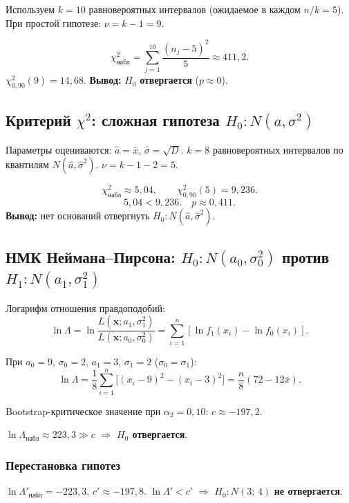 \documentclass[12pt,a4paper]{article}
\newcommand{\ahat}{\hat{a}}
\newcommand{\xbar}{\bar{x}}
\begin{document}
	Используем $k=10$ равновероятных интервалов (ожидаемое в каждом $n/k = 5$).
	При простой гипотезе: $\nu = k-1 = 9$.
	
	\[
	\chi^2_{\text{набл}} = \sum_{j=1}^{10}\frac{(n_j - 5)^2}{5} \approx 411{,}2.
	\]
	$\chi^2_{0{,}90}(9) = 14{,}68$.
	\textbf{Вывод:} $H_0$ \textbf{отвергается} ($p \approx 0$).
	
	\subsection{Критерий \texorpdfstring{$\chi^2$}{chi2}: сложная гипотеза
		\texorpdfstring{$H_0\colon N(a,\sigma^2)$}{}}
	
	Параметры оцениваются: $\ahat = \xbar$, $\hat\sigma = \sqrt{D}$.
	$k=8$ равновероятных интервалов по квантилям $N(\ahat, \hat\sigma^2)$.
	$\nu = k - 1 - 2 = 5$.
	
	\[
	\chi^2_{\text{набл}} \approx 5{,}04, \qquad
	\chi^2_{0{,}90}(5) = 9{,}236.
	\]
	\[
	5{,}04 < 9{,}236. \quad p \approx 0{,}411.
	\]
	\textbf{Вывод:} нет оснований отвергнуть $H_0\colon N(\ahat, \hat\sigma^2)$.
	
	\subsection{НМК Неймана--Пирсона:
		\texorpdfstring{$H_0\colon N(a_0,\sigma_0^2)$}{} против
		\texorpdfstring{$H_1\colon N(a_1,\sigma_1^2)$}{}}
	
	Логарифм отношения правдоподобий:
	\[
	\ln\Lambda = \ln\frac{L(\mathbf{x}; a_1, \sigma_1^2)}{L(\mathbf{x}; a_0, \sigma_0^2)}
	= \sum_{i=1}^{n}\left[\ln f_1(x_i) - \ln f_0(x_i)\right].
	\]
	
	При $a_0=9$, $\sigma_0=2$, $a_1=3$, $\sigma_1=2$ ($\sigma_0=\sigma_1$):
	\[
	\ln\Lambda
	= \frac{1}{8}\sum_{i=1}^n \bigl[(x_i-9)^2 - (x_i-3)^2\bigr]
	= \frac{n}{8}(72 - 12\xbar).
	\]
	
	Bootstrap-критическое значение при $\alpha_2 = 0{,}10$: $c \approx -197{,}2$.
	
	$\ln\Lambda_{\text{набл}} \approx 223{,}3 \gg c$ $\Rightarrow$ \textbf{$H_0$ отвергается}.
	
	\subsubsection*{Перестановка гипотез}
	$\ln\Lambda'_{\text{набл}} = -223{,}3$, $c' \approx -197{,}8$.
	$\ln\Lambda' < c'$ $\Rightarrow$ $H_0\colon N(3;\,4)$ \textbf{не отвергается}.
	
\end{document}
